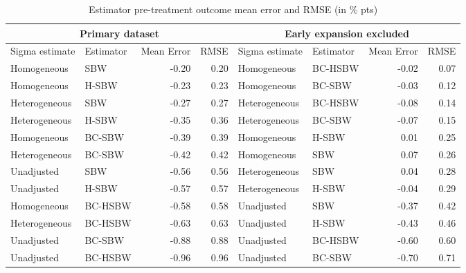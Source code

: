 \documentclass[aoas]{imsart}
\theoremstyle{plain}
\theoremstyle{remark}
\begin{document}
\begin{table}\caption{Estimator pre-treatment outcome mean error and RMSE (in \% pts)}\label{tab:pretxpred}
\centering
\begin{tabular}{llrrllrr}
\hline
\multicolumn{4}{c}{Primary dataset} & \multicolumn{4}{c}{Early expansion 
 excluded} \\ 
 \hline
Sigma estimate & Estimator & Mean Error & RMSE & Sigma estimate & Estimator & Mean Error & RMSE \\ 
\hline
Homogeneous & SBW & -0.20 & 0.20 & Homogeneous & BC-HSBW & -0.02 & 0.07 \\ 
Homogeneous & H-SBW & -0.23 & 0.23 & Homogeneous & BC-SBW & -0.03 & 0.12 \\ 
Heterogeneous & SBW & -0.27 & 0.27 & Heterogeneous & BC-HSBW & -0.08 & 0.14 \\ 
Heterogeneous & H-SBW & -0.35 & 0.36 & Heterogeneous & BC-SBW & -0.07 & 0.15 \\ 
Homogeneous & BC-SBW & -0.39 & 0.39 & Homogeneous & H-SBW & 0.01 & 0.25 \\ 
Heterogeneous & BC-SBW & -0.42 & 0.42 & Homogeneous & SBW & 0.07 & 0.26 \\ 
Unadjusted & SBW & -0.56 & 0.56 & Heterogeneous & SBW & 0.04 & 0.28 \\ 
Unadjusted & H-SBW & -0.57 & 0.57 & Heterogeneous & H-SBW & -0.04 & 0.29 \\ 
Homogeneous & BC-HSBW & -0.58 & 0.58 & Unadjusted & SBW & -0.37 & 0.42 \\ 
Heterogeneous & BC-HSBW & -0.63 & 0.63 & Unadjusted & H-SBW & -0.43 & 0.46 \\ 
Unadjusted & BC-SBW & -0.88 & 0.88 & Unadjusted & BC-HSBW & -0.60 & 0.60 \\ 
Unadjusted & BC-HSBW & -0.96 & 0.96 & Unadjusted & BC-SBW & -0.70 & 0.71 \\ 
 \hline
\end{tabular}
\end{table}
\end{document}
